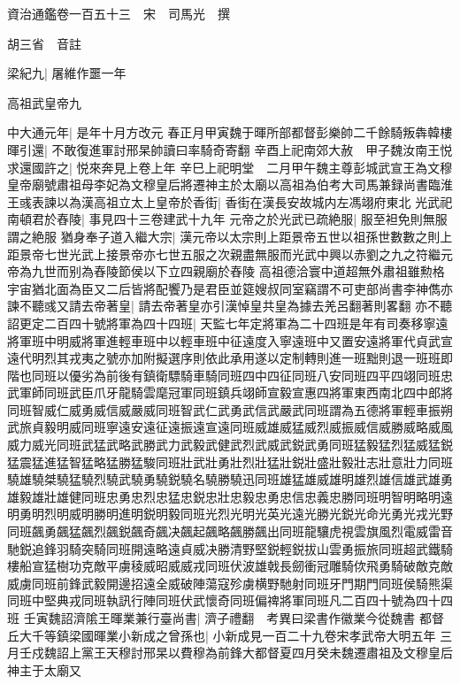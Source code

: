 資治通鑑卷一百五十三　宋　司馬光　撰

胡三省　音註

梁紀九|{
	屠維作噩一年}


高祖武皇帝九

中大通元年|{
	是年十月方改元}
春正月甲寅魏于暉所部都督彭樂帥二千餘騎叛犇韓樓暉引還|{
	不敢復進軍討邢杲帥讀曰率騎奇寄翻}
辛酉上祀南郊大赦　甲子魏汝南王悦求還國許之|{
	悦來奔見上卷上年}
辛巳上祀明堂　二月甲午魏主尊彭城武宣王為文穆皇帝廟號肅祖母李妃為文穆皇后將遷神主於太廟以高祖為伯考大司馬兼録尚書臨淮王彧表諫以為漢高祖立太上皇帝於香街|{
	香街在漢長安故城内左馮翊府東北}
光武祀南頓君於舂陵|{
	事見四十三卷建武十九年}
元帝之於光武已疏絶服|{
	服至袒免則無服謂之絶服}
猶身奉子道入繼大宗|{
	漢元帝以太宗則上距景帝五世以祖孫世數數之則上距景帝七世光武上接景帝亦七世五服之次親盡無服而光武中興以赤劉之九之符繼元帝為九世而别為舂陵節侯以下立四親廟於舂陵}
高祖德洽寰中道超無外肅祖雖勲格宇宙猶北面為臣又二后皆將配饗乃是君臣並筵嫂叔同室竊謂不可吏部尚書李神儁亦諫不聽彧又請去帝著皇|{
	請去帝著皇亦引漢悼皇共皇為據去羌呂翻著則畧翻}
亦不聽　詔更定二百四十號將軍為四十四班|{
	天監七年定將軍為二十四班是年有司奏移寧遠將軍班中明威將軍進輕車班中以輕車班中征遠度入寧遠班中又置安遠將軍代貞武宣遠代明烈其戎夷之號亦加附擬選序則依此承用遂以定制轉則進一班黜則退一班班即階也同班以優劣為前後有鎮衛驃騎車騎同班四中四征同班八安同班四平四翊同班忠武軍師同班武臣爪牙龍騎雲麾冠軍同班鎮兵翊師宣毅宣惠四將軍東西南北四中郎將同班智威仁威勇威信威嚴威同班智武仁武勇武信武嚴武同班謂為五德將軍輕車振朔武旅貞毅明威同班寧遠安遠征遠振遠宣遠同班威雄威猛威烈威振威信威勝威略威風威力威光同班武猛武略武勝武力武毅武健武烈武威武鋭武勇同班猛毅猛烈猛威猛鋭猛震猛進猛智猛略猛勝猛駿同班壯武壯勇壯烈壯猛壯鋭壯盛壯毅壯志壯意壯力同班驍雄驍桀驍猛驍烈驍武驍勇驍鋭驍名驍勝驍迅同班雄猛雄威雄明雄烈雄信雄武雄勇雄毅雄壯雄健同班忠勇忠烈忠猛忠鋭忠壯忠毅忠勇忠信忠義忠勝同班明智明略明遠明勇明烈明威明勝明進明鋭明毅同班光烈光明光英光遠光勝光鋭光命光勇光戎光野同班飆勇飆猛飆烈飆鋭飆奇飆决飆起飆略飆勝飆出同班龍驤虎視雲旗風烈電威雷音馳鋭追鋒羽騎突騎同班開遠略遠貞威决勝清野堅鋭輕鋭拔山雲勇振旅同班超武鐵騎樓船宣猛樹功克敵平虜稜威昭威威戎同班伏波雄戟長劒衝冠雕騎佽飛勇騎破敵克敵威虜同班前鋒武毅開邊招遠全威破陣蕩寇殄虜横野馳射同班牙門期門同班侯騎熊渠同班中堅典戎同班執訊行陣同班伏武懷奇同班偏禆將軍同班凡二百四十號為四十四班}
壬寅魏詔濟隂王暉業兼行臺尚書|{
	濟子禮翻　考異曰梁書作徽業今從魏書}
都督丘大千等鎮梁國暉業小新成之曾孫也|{
	小新成見一百二十九卷宋孝武帝大明五年}
三月壬戍魏詔上黨王天穆討邢杲以費穆為前鋒大都督夏四月癸未魏遷肅祖及文穆皇后神主于太廟又

